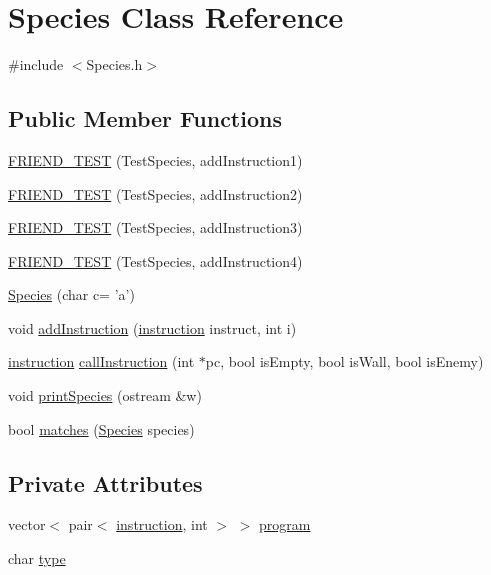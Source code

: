 \hypertarget{classSpecies}{\section{Species Class Reference}
\label{classSpecies}
}


{\ttfamily \#include $<$Species.\-h$>$}

\subsection*{Public Member Functions}
\begin{DoxyCompactItemize}
\item 
\hyperlink{classSpecies_af1a77c196766e9df1a5bd7853419c5e3}{F\-R\-I\-E\-N\-D\-\_\-\-T\-E\-S\-T} (Test\-Species, add\-Instruction1)
\item 
\hyperlink{classSpecies_ad1f08905c5e080bc5e095053166c704c}{F\-R\-I\-E\-N\-D\-\_\-\-T\-E\-S\-T} (Test\-Species, add\-Instruction2)
\item 
\hyperlink{classSpecies_a39d596a521ca21a4e8b73c3cc834c1ef}{F\-R\-I\-E\-N\-D\-\_\-\-T\-E\-S\-T} (Test\-Species, add\-Instruction3)
\item 
\hyperlink{classSpecies_a92b93fa396e2e2db33bb5c133787a6ef}{F\-R\-I\-E\-N\-D\-\_\-\-T\-E\-S\-T} (Test\-Species, add\-Instruction4)
\item 
\hyperlink{classSpecies_a678c8bd511f6286c2ea7674b5f1a86f6}{Species} (char c= 'a')
\item 
void \hyperlink{classSpecies_af18b79e2c23dd5052d05f2b1c6ce22e9}{add\-Instruction} (\hyperlink{Species_8h_a8d53f52811787ac7b91d1fd31f23c5e3}{instruction} instruct, int i)
\item 
\hyperlink{Species_8h_a8d53f52811787ac7b91d1fd31f23c5e3}{instruction} \hyperlink{classSpecies_a8955598b05cb69a2c643f975f2c45206}{call\-Instruction} (int $\ast$pc, bool is\-Empty, bool is\-Wall, bool is\-Enemy)
\item 
void \hyperlink{classSpecies_a9fa78aa403c3a481fe6e039770f09f1a}{print\-Species} (ostream \&w)
\item 
bool \hyperlink{classSpecies_a7f282906fede2db688ee1ccd7e582ca1}{matches} (\hyperlink{classSpecies}{Species} species)
\end{DoxyCompactItemize}
\subsection*{Private Attributes}
\begin{DoxyCompactItemize}
\item 
vector$<$ pair$<$ \hyperlink{Species_8h_a8d53f52811787ac7b91d1fd31f23c5e3}{instruction}, int $>$ $>$ \hyperlink{classSpecies_a249d8af5aece24c814aa92899857c39e}{program}
\item 
char \hyperlink{classSpecies_a11d8322bde2785cf7164239a70bc1ad8}{type}
\end{DoxyCompactItemize}


